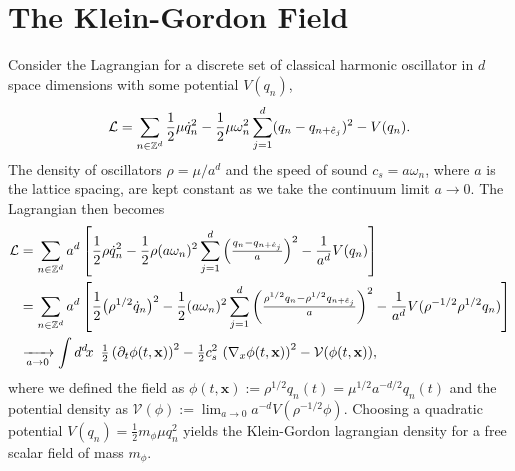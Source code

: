 \documentclass[../QFT_main.tex]{subfiles}
\begin{document}
\section{The Klein-Gordon Field}

\begin{mytheorem}
%
Consider the Lagrangian for a discrete set of classical harmonic oscillator in $d$ space dimensions with some potential $V(q_n)$,
\begin{align}
    \mathcal{L}= \sum_{n\in \mathbb{Z}^d}\frac{1}{2} \mu \dot{q}_n^2 - \frac{1}{2} \mu \omega_n^2 \sum_{j=1}^d (q_n - q_{n +\hat{e}_j})^2 - V(q_n).
\end{align}
The density of oscillators $\rho = \mu / a^d$ and the speed of sound $c_s = a \omega_n$, where $a$ is the lattice spacing, are kept constant as we take the continuum limit $a \to 0$.
The Lagrangian then becomes
\begin{align}
    \mathcal{L} &= \sum_{n\in \mathbb{Z}^d} a^d \left[ \frac{1}{2} \rho \dot{q}_n^2 - \frac{1}{2} \rho (a\omega_n)^2 \sum_{j=1}^d \left(\tfrac{q_n - q_{n +\hat{e}_j}}{a}\right)^2 - \frac{1}{a^d} V(q_n) \right]
    \\
    &=
    \sum_{n\in \mathbb{Z}^d} a^d \left[ \frac{1}{2} \big(\rho^{1/2} \dot{q}_n\big)^2 - \frac{1}{2} (a\omega_n)^2 \sum_{j=1}^d \left(\tfrac{\rho^{1/2}q_n - \rho^{1/2}q_{n +\hat{e}_j}}{a}\right)^2 - \frac{1}{a^d} V(\rho^{-1/2}\rho^{1/2}q_n) \right]
    \\
    &\xrightarrow[a\to 0]{} \int d^d\!x\,\,\, \tfrac{1}{2} \left(\partial_t\phi(t,\mathbf{x})\right)^2 - \tfrac{1}{2} c_s^2 \,\left(\nabla_x\phi(t,\mathbf{x})\right)^2 - \mathcal{V}(\phi(t,\mathbf{x})),
\end{align}
where we defined the field as $\phi(t,\mathbf{x}) := \rho^{1/2} q_n(t)= \mu^{1/2}a^{-d/2} q_n(t)$ and the potential density as $\mathcal{V}(\phi) := \lim_{a\to 0} a^{-d} V(\rho^{-1/2} \phi)$.
Choosing a quadratic potential $V(q_n) = \tfrac{1}{2} m_\phi \mu q_n^2$ yields the Klein-Gordon lagrangian density for a free scalar field of mass $m_\phi$.



\end{mytheorem}
\end{document}
